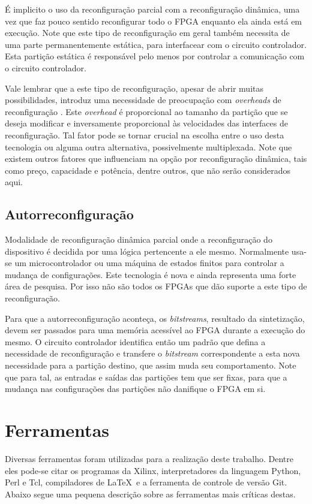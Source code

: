 \documentclass[11pt,a4paper,oneside]{book}
\begin{document}
É implicito o uso da reconfiguração parcial com a reconfiguração dinâmica, uma vez que faz pouco sentido reconfigurar todo o FPGA enquanto ela ainda está em execução.
Note que este tipo de reconfiguração em geral também necessita de uma parte permanentemente est\'atica, para interfacear com o circuito controlador.
Esta parti\c{c}\~ao est\'atica \'e respons\'avel pelo menos por controlar a comunica\c{c}\~ao com o circuito controlador.

Vale lembrar que a este tipo de reconfiguração, apesar de abrir muitas possibilidades, introduz uma necessidade de preocupação com \textit{overheads} de reconfiguração \cite{Hauck2007}.
Este \textit{overhead} é proporcional ao tamanho da partição que se deseja modificar e inversamente proporcional às velocidades das interfaces de reconfiguração.
Tal fator pode se tornar crucial na escolha entre o uso desta tecnologia ou alguma outra alternativa, possivelmente multiplexada.
Note que existem outros fatores que influenciam na opção por reconfiguração dinâmica, tais como preço, capacidade e potência, dentre outros, que não serão considerados aqui.

\subsection{Autorreconfigura\c{c}\~ao}
Modalidade de reconfigura\c{c}\~ao din\^amica parcial onde a reconfigura\c{c}\~ao do dispositivo \'e decidida por uma l\'ogica pertencente a ele mesmo.
Normalmente usa-se um microcontrolador ou uma m\'aquina de estados finitos para controlar a mudan\c{c}a de configura\c{c}\~oes.
Este tecnologia \'e nova e ainda representa uma forte \'area de pesquisa.
Por isso n\~ao s\~ao todos os FPGAs que d\~ao suporte a este tipo de reconfigura\c{c}\~ao.

Para que a autorreconfigura\c{c}\~ao aconte\c{c}a, os \textit{bitstreams}, resultado da sintetiza\c{c}\~ao, devem ser passados para uma mem\'oria acess\'i­vel ao FPGA durante a execu\c{c}\~ao do mesmo.
O circuito controlador identifica ent\~ao um padr\~ao que defina a necessidade de reconfigura\c{c}\~ao e transfere o \textit{bitstream} correspondente a esta nova necessidade para a parti\c{c}\~ao destino, que assim muda seu comportamento.
Note que para tal, as entradas e sa\'i­das das parti\c{c}\~oes tem que ser fixas, para que a mudan\c{c}a nas configura\c{c}\~oes das parti\c{c}\~oes n\~ao danifique o FPGA em si.

\section{Ferramentas}
Diversas ferramentas foram utilizadas para a realização deste trabalho.
Dentre eles pode-se citar os programas da Xilinx, interpretadores da linguagem Python, Perl e Tcl, compiladores de \LaTeX~e a ferramenta de controle de versão Git.
Abaixo segue uma pequena descrição sobre as ferramentas mais críticas destas.
\end{document}
